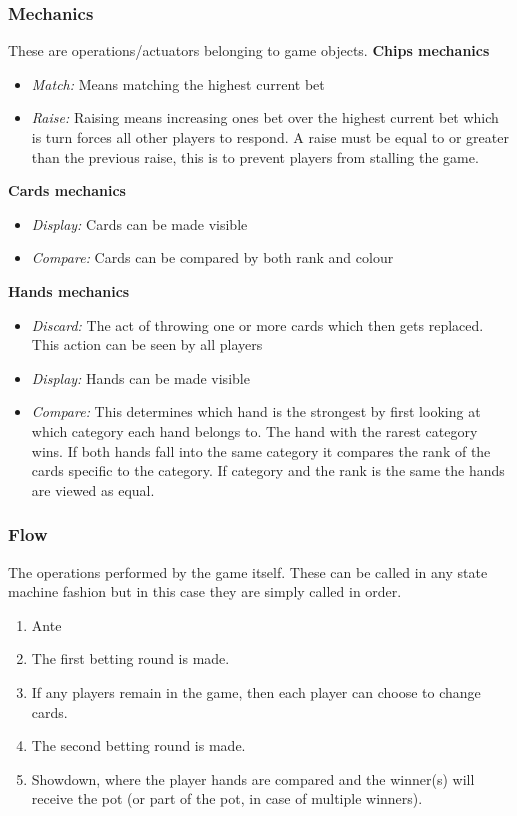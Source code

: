 \documentclass[../main.tex]{subfiles}
\begin{document}
\subsubsection{Mechanics}
These are operations/actuators belonging to game objects.
\newline\newline
\textbf{Chips mechanics}
\begin{itemize}
    \item \textit{Match:} Means matching the highest current bet
    \item \textit{Raise:} Raising means increasing ones bet over the highest current bet which is turn forces all other players to respond. A raise must be equal to or greater than the previous raise, this is to prevent players from stalling the game.
\end{itemize}

\textbf{Cards mechanics}
\begin{itemize}
    \item \textit{Display:} Cards can be made visible \newline
    \item \textit{Compare:} Cards can be compared by both rank and colour
\end{itemize}
    
\textbf{Hands mechanics}
\begin{itemize}
    \item \textit{Discard:} The act of throwing one or more cards which then gets replaced. This action can be seen by all players
    \item \textit{Display:} Hands can be made visible
    \item \textit{Compare:} This determines which hand is the strongest by first looking at which category each hand belongs to. The hand with the rarest category wins. If both hands fall into the same category it compares the rank of the cards specific to the category. If category and the rank is the same the hands are viewed as equal. 
\end{itemize}
	
\subsubsection{Flow} 
The operations performed by the game itself. These can be called in any state machine fashion but in this case they are simply called in order.
\begin{enumerate}
    \item Ante
    \item The first betting round is made.
    \item If any players remain in the game, then each player can choose to change cards.
    \item The second betting round is made.
    \item Showdown, where the player hands are compared and the winner(s) will receive the pot (or part of the pot, in case of multiple winners).
\end{enumerate}
\end{document}
